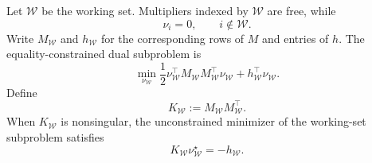 \documentclass[11pt]{article}
\begin{document}
Let \(\mathcal W\) be the working set. Multipliers indexed by
\(\mathcal W\) are free, while
\[
\nu_i=0,\qquad i\notin\mathcal W.
\]
Write \(M_{\mathcal W}\) and \(h_{\mathcal W}\) for the corresponding
rows of \(M\) and entries of \(h\). The equality-constrained dual
subproblem is
\begin{equation}
\min_{\nu_{\mathcal W}}
\frac{1}{2}\nu_{\mathcal W}^\top
M_{\mathcal W}M_{\mathcal W}^\top\nu_{\mathcal W}
+h_{\mathcal W}^\top\nu_{\mathcal W}.
\label{eq:working-subproblem}
\end{equation}
Define
\[
K_{\mathcal W}:=
M_{\mathcal W}M_{\mathcal W}^\top.
\]
When \(K_{\mathcal W}\) is nonsingular, the unconstrained minimizer
of the working-set subproblem satisfies
\begin{equation}
K_{\mathcal W}\nu_{\mathcal W}^\star=-h_{\mathcal W}.
\label{eq:working-solve}
\end{equation}
\end{document}
